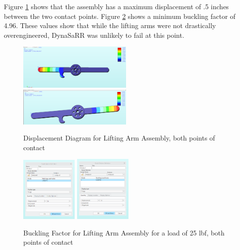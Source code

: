 Figure \ref{fig:disp2} shows that the assembly has a maximum displacement of .5 inches between the two contact points. Figure \ref{fig:buck2} shows a minimum buckling factor of 4.96. These values show that while the lifting arms were not drastically overengineered, DynaSaRR was unlikely to fail at this point.
\begin{figure}[hp]
    \centering
    \includegraphics[width=0.5\textwidth]{Images/lifting_arm_final_1_disp.PNG}
    \includegraphics[width=0.5\textwidth]{Images/lifting_arm_final_2_disp.PNG}
    \caption{Displacement Diagram for Lifting Arm Assembly, both points of contact}
    \label{fig:disp2}
\end{figure}
\newpage

\begin{figure}[hp]
    \centering
    \includegraphics[width=0.25\textwidth]{Images/lifting_arm_final_1_buckle.PNG}
    \includegraphics[width=0.25\textwidth]{Images/lifting_arm_final_2_buckle.PNG}
    \caption{Buckling Factor for Lifting Arm Assembly for a load of 25 lbf, both points of contact}
    \label{fig:buck2}
\end{figure}
\newpage

